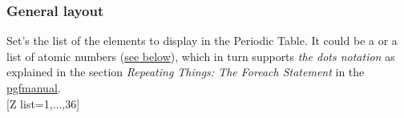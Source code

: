 \subsubsection{\texorpdfstring{ General layout}{General layout}}%
\label{option_Z list}%
%
{Set's the list of the elements to display in the Periodic Table. It could be a  or a  list of atomic numbers (\hyperlink{Zlistdesc}{see below}), which in turn supports \textit{the dots notation} as explained in the section \textit{Repeating Things: The Foreach Statement} in the \href{https://www.ctan.org/pkg/pgf}{pgfmanual}.\vskip0pt\relax}
\\ [5pt][Z list={1,...,36}]%
\\ [5pt]\makebox[\linewidth][c]{\scalebox{.6}{\pgfPT[Z list={1,...,36}]}}%
